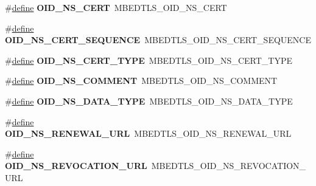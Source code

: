 \begin{DoxyCompactItemize}
\mbox{\label{compat-1_83_8h_ac8fb06c12b58f8c23fb9cee1a6583086}} 
\#\hyperlink{structdefine}{define} {\bfseries O\+I\+D\+\_\+\+N\+S\+\_\+\+C\+E\+RT}~M\+B\+E\+D\+T\+L\+S\+\_\+\+O\+I\+D\+\_\+\+N\+S\+\_\+\+C\+E\+RT
\item 
\mbox{\label{compat-1_83_8h_a6e11b6bd4f46654c9c302e314c738db0}} 
\#\hyperlink{structdefine}{define} {\bfseries O\+I\+D\+\_\+\+N\+S\+\_\+\+C\+E\+R\+T\+\_\+\+S\+E\+Q\+U\+E\+N\+CE}~M\+B\+E\+D\+T\+L\+S\+\_\+\+O\+I\+D\+\_\+\+N\+S\+\_\+\+C\+E\+R\+T\+\_\+\+S\+E\+Q\+U\+E\+N\+CE
\item 
\mbox{\label{compat-1_83_8h_a971f29a78ac0ac1dc488bf290426d494}} 
\#\hyperlink{structdefine}{define} {\bfseries O\+I\+D\+\_\+\+N\+S\+\_\+\+C\+E\+R\+T\+\_\+\+T\+Y\+PE}~M\+B\+E\+D\+T\+L\+S\+\_\+\+O\+I\+D\+\_\+\+N\+S\+\_\+\+C\+E\+R\+T\+\_\+\+T\+Y\+PE
\item 
\mbox{\label{compat-1_83_8h_ade01c6901220a5ddb39e22921c0f2700}} 
\#\hyperlink{structdefine}{define} {\bfseries O\+I\+D\+\_\+\+N\+S\+\_\+\+C\+O\+M\+M\+E\+NT}~M\+B\+E\+D\+T\+L\+S\+\_\+\+O\+I\+D\+\_\+\+N\+S\+\_\+\+C\+O\+M\+M\+E\+NT
\item 
\mbox{\label{compat-1_83_8h_aab1593aa6d2423be15638f0dd3c36ad1}} 
\#\hyperlink{structdefine}{define} {\bfseries O\+I\+D\+\_\+\+N\+S\+\_\+\+D\+A\+T\+A\+\_\+\+T\+Y\+PE}~M\+B\+E\+D\+T\+L\+S\+\_\+\+O\+I\+D\+\_\+\+N\+S\+\_\+\+D\+A\+T\+A\+\_\+\+T\+Y\+PE
\item 
\mbox{\label{compat-1_83_8h_a2d508479e3767beefe6eb8d6233b81d2}} 
\#\hyperlink{structdefine}{define} {\bfseries O\+I\+D\+\_\+\+N\+S\+\_\+\+R\+E\+N\+E\+W\+A\+L\+\_\+\+U\+RL}~M\+B\+E\+D\+T\+L\+S\+\_\+\+O\+I\+D\+\_\+\+N\+S\+\_\+\+R\+E\+N\+E\+W\+A\+L\+\_\+\+U\+RL
\item 
\mbox{\label{compat-1_83_8h_a8e8251c504d5fae82cb7c59f8e85d7b3}} 
\#\hyperlink{structdefine}{define} {\bfseries O\+I\+D\+\_\+\+N\+S\+\_\+\+R\+E\+V\+O\+C\+A\+T\+I\+O\+N\+\_\+\+U\+RL}~M\+B\+E\+D\+T\+L\+S\+\_\+\+O\+I\+D\+\_\+\+N\+S\+\_\+\+R\+E\+V\+O\+C\+A\+T\+I\+O\+N\+\_\+\+U\+RL
\item 
\mbox{\label{compat-1_83_8h_a140448fdb31691fce7bc4488bafbac3c}} 

\end{DoxyCompactItemize}
